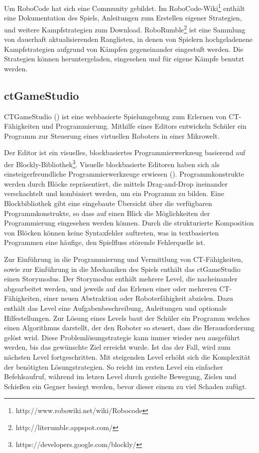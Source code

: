 Um RoboCode hat sich eine Community gebildet. Im
RoboCode-Wiki\footnote{http://www.robowiki.net/wiki/Robocode} enthält eine Dokumentation des Spiels,
Anleitungen zum Erstellen eigener Strategien, und weitere Kampfstrategien zum Download.
RoboRumble\footnote{http://literumble.appspot.com/} ist eine Sammlung von dauerhaft aktualisierenden
Ranglisten, in denen von Spielern hochgeladenene Kampfstrategien aufgrund von Kämpfen gegeneinander
eingestuft werden. Die Strategien können heruntergeladen, eingesehen und für eigene Kämpfe benutzt
werden.

\subsection{ctGameStudio}

CTGameStudio (\cite{werneburg_ctgamestudiogame-based_2018}) ist eine webbasierte Spielumgebung zum
Erlernen von CT-Fähigkeiten und Programmierung. Mithilfe eines Editors entwickeln Schüler ein
Programm zur Steuerung eines virtuellen Roboters in einer Mikrowelt.

Der Editor ist ein visuelles, blockbasiertes Programmierwerkzeug basierend auf der
Blockly-Bibliothek\footnote{https://developers.google.com/blockly/}. Visuelle blockbasierte Editoren
haben sich als einsteigerfreundliche Programmierwerkzeuge erwiesen (\cite{weintrop_block_2015}).
Programmkonstrukte werden durch Blöcke repräsentiert, die mittels Drag-and-Drop ineinander
verschachtelt und kombiniert werden, um ein Programm zu bilden. Eine Blockbibliothek gibt eine
eingebaute Übersicht über die verfügbaren Programmkonstrukte, so dass auf einen Blick die
Möglichkeiten der Programmierung eingesehen werden können. Durch die strukturierte Komposition von
Blöcken können keine Syntaxfehler auftreten, was in textbasierten Programmen eine häufige, den
Spielfluss störende Fehlerquelle ist.

Zur Einführung in die Programmierung und Vermittlung von CT-Fähigkeiten, sowie zur Einführung in die
Mechaniken des Spiels enthält das ctGameStudio einen Storymodus. Der Storymodus enthält mehrere
Level, die nacheinander abgearbeitet werden, und jeweils auf das Erlenen einer oder mehreren
CT-Fähigkeiten, einer neuen Abstraktion oder Roboterfähigkeit abzielen. Dazu enthält das Level eine
Aufgabenbeschreibung, Anleitungen und optionale Hilfestellungen. Zur Lösung eines Levels baut der Schüler ein
Programm welches einen Algorithmus darstellt, der den Roboter so steuert, dass die Herausforderung
gelöst wrid. Diese Problemlösungstrategie kann immer wieder neu ausgeführt werden, bis das
gewünschte Ziel erreicht wurde. Ist das der Fall, wird zum nächsten Level fortgeschritten. Mit
steigenden Level erhöht sich die Komplexität der benötigten Lösungstrategien. So reicht im ersten
Level ein einfacher Befehlsaufruf, während im letzen Level durch gezielte Bewegung, Zielen und
Schießen ein Gegner besiegt werden, bevor dieser einem zu viel Schaden zufügt.

